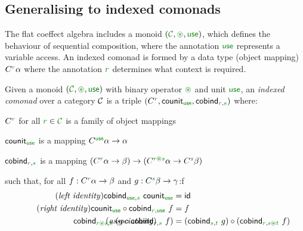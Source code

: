 
\subsection{Generalising to indexed comonads}
\label{sec:semantics-flat-idx}

The flat coeffect algebra includes a monoid $(\C, \cseq, \cunit)$, which defines the behaviour of
sequential composition, where the annotation $\cunit$ represents a variable access. An indexed 
comonad is formed by a data type (object mapping) $\ctyp{\cclrd{r}}{\alpha}$ where the annotation 
$\cclrd{r}$ determines what context is required. 

\begin{definition}
Given a monoid $(\C, \cseq, \cunit)$ with binary operator $\cseq$ and unit $\cunit$, an 
\emph{indexed comonad} over a category $\mathcal{C}$ is a triple 
$(\ctyp{\cclrd{r}{}}, \ident{counit}_{\cunit}, \ident{cobind}_{\cclrd{r}, \cclrd{s}})$ where:

\begin{compactitem}
\item $\ctyp{\cclrd{r}}{}$ for all $\cclrd{r} \in \C$ is a family of object mappings 
\item $\ident{counit}_{\cunit}$ is a mapping $\ctyp{\cunit}{\alpha} \rightarrow \alpha$ 
\item $\ident{cobind}_{\cclrd{r}, \cclrd{s}}$ is a mapping $(\ctyp{\cclrd{r}}{\alpha} \rightarrow \beta) 
  \rightarrow (\ctyp{\cclrd{r}\cseq\cclrd{s}}{\alpha} \rightarrow \ctyp{\cclrd{s}}{\beta})$
\end{compactitem}
such that, for all $f:\ctyp{\cclrd{r}}{\alpha} \rightarrow \beta$ and $g:\ctyp{\cclrd{s}}{\beta} \rightarrow \gamma$:f
\begin{align}
\tag{\emph{left identity}}
  \ident{cobind}_{\cunit, \cclrd{s}}~\ident{counit}_{\cunit} &= \idf{}
  \\
\tag{\emph{right identity}}
  \ident{counit}_{\cunit} \circ \ident{cobind}_{\cclrd{r}, \cunit}~f &= f
  \\
\tag{\emph{associativity}}
\hspace{-10em}
  \ident{cobind}_{\cclrd{r}\cseq\cclrd{s},\cclrd{t}}~(g \circ \ident{cobind}_{\cclrd{r}, \cclrd{s}}~f) &= 
    (\ident{cobind}_{\cclrd{s}, \cclrd{t}}~g) \circ (\ident{cobind}_{\cclrd{r}, \cclrd{s}\cseq\cclrd{t}}~f)
\end{align}
\end{definition}

